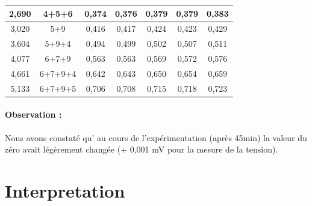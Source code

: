 \documentclass[10pt,a4paper]{report}
\begin{document}
\begin{center}
\begin{tabular}{|c|c|c|c|c|c|c|}
{\color[HTML]{963400} 2,690}                            & {\color[HTML]{963400} 4+5+6}                     & {\color[HTML]{00009B} 0,374}      & {\color[HTML]{00009B} 0,376}      & {\color[HTML]{00009B} 0,379}     & {\color[HTML]{00009B} 0,379}      & {\color[HTML]{00009B} 0,383}      \\ \hline
{\color[HTML]{963400} 3,020}                            & {\color[HTML]{963400} 5+9}                       & {\color[HTML]{00009B} 0,416}      & {\color[HTML]{00009B} 0,417}      & {\color[HTML]{00009B} 0,424}     & {\color[HTML]{00009B} 0,423}      & {\color[HTML]{00009B} 0,429}      \\ \hline
{\color[HTML]{963400} 3,604}                            & {\color[HTML]{963400} 5+9+4}                     & {\color[HTML]{00009B} 0,494}      & {\color[HTML]{00009B} 0,499}      & {\color[HTML]{00009B} 0,502}     & {\color[HTML]{00009B} 0,507}      & {\color[HTML]{00009B} 0,511}      \\ \hline
{\color[HTML]{963400} 4,077}                            & {\color[HTML]{963400} 6+7+9}                     & {\color[HTML]{00009B} 0,563}      & {\color[HTML]{00009B} 0,563}      & {\color[HTML]{00009B} 0,569}     & {\color[HTML]{00009B} 0,572}      & {\color[HTML]{00009B} 0,576}      \\ \hline
{\color[HTML]{963400} 4,661}                            & {\color[HTML]{963400} 6+7+9+4}                   & {\color[HTML]{00009B} 0,642}      & {\color[HTML]{00009B} 0,643}      & {\color[HTML]{00009B} 0,650}     & {\color[HTML]{00009B} 0,654}      & {\color[HTML]{00009B} 0,659}      \\ \hline
{\color[HTML]{963400} 5,133}                            & {\color[HTML]{963400} 6+7+9+5}                   & {\color[HTML]{00009B} 0,706}      & {\color[HTML]{00009B} 0,708}      & {\color[HTML]{00009B} 0,715}     & {\color[HTML]{00009B} 0,718}      & {\color[HTML]{00009B} 0,723}      \\ \hline

\end{tabular}
\end{center}
\paragraph{Observation :} Nous avons constaté qu' au cours de l'expérimentation (après 45min) la valeur du zéro avait légèrement changée (+  0,001 mV pour la mesure de la tension). 
\section{Interpretation}	
\end{document}
